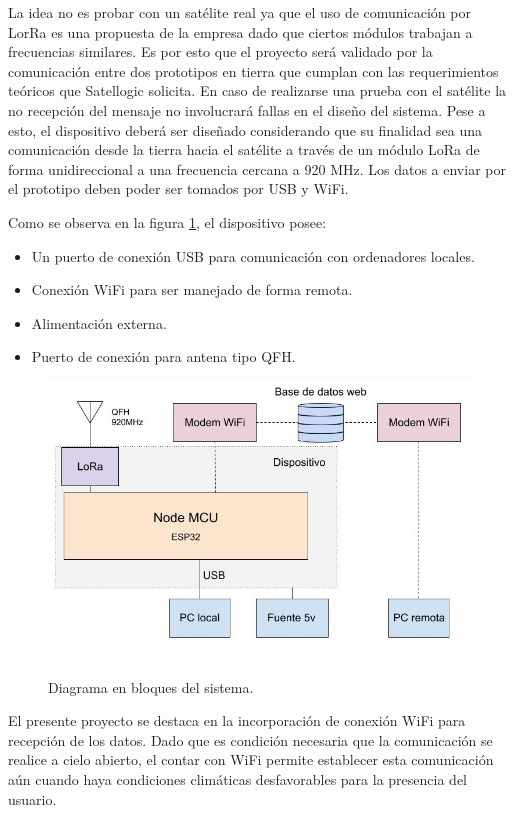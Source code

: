 \documentclass[
11pt, %
codirector, %
]{charter}
\begin{document}
La idea no es probar con un satélite real ya que el uso de comunicación por LorRa es una propuesta de la empresa dado que ciertos módulos trabajan a frecuencias similares. Es por esto que el proyecto será validado por la comunicación entre dos prototipos en tierra que cumplan con las requerimientos teóricos que Satellogic solicita. En caso de realizarse una prueba con el satélite la no recepción del mensaje no involucrará fallas en el diseño del sistema.
Pese a esto, el dispositivo deberá ser diseñado considerando que su finalidad sea una comunicación desde la tierra hacia el satélite a través de un módulo LoRa de forma unidireccional a una frecuencia cercana a 920 MHz. Los datos a enviar por el prototipo deben poder ser tomados por USB y WiFi.


Como se observa en la figura \ref{fig:diagBloques}, el dispositivo posee:
\begin{itemize}
	\item Un puerto de conexión USB para comunicación con ordenadores locales.
	\item Conexión WiFi para ser manejado de forma remota.
	\item Alimentación externa.
	\item Puerto de conexión para antena tipo QFH.
\end{itemize}

\begin{figure}[htpb]
\centering 
\includegraphics[width=.8\textwidth]{./Figuras/Diagrama de bloques.jpg}
\caption{Diagrama en bloques del sistema.}
\label{fig:diagBloques}
\end{figure}

\vspace{25px}

El presente proyecto se destaca en la incorporación de conexión WiFi para recepción de los datos. Dado que es condición necesaria que la comunicación se realice a cielo abierto, el contar con WiFi permite establecer esta comunicación aún cuando haya condiciones climáticas desfavorables para la presencia del usuario.
\end{document}
